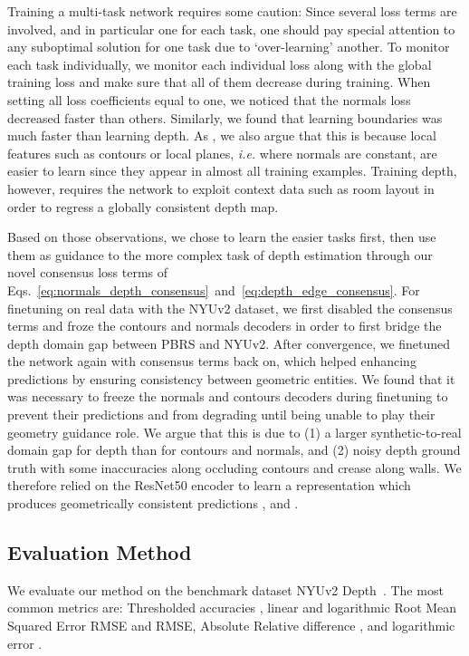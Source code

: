 \documentclass[10pt,twocolumn,letterpaper]{article}
\begin{document}
Training a multi-task network requires some caution: Since several loss terms
are involved, and in particular one for each task, one should pay special
attention to any suboptimal solution for one task due to `over-learning' 
another. To monitor each task individually, we monitor each individual loss 
along with the global training loss and make sure that all of them decrease 
during training. When setting all loss coefficients equal to one, we noticed 
that the normals loss  decreased faster than others. 
Similarly, we found that learning boundaries was much faster than learning 
depth. As \cite{zhang2018deepdepth}, we also argue that this is because local 
features such as contours or local planes, \emph{i.e.} where normals are 
constant, are easier to learn since they appear in almost all training 
examples. Training depth, however, requires the network to exploit context data 
such as room layout in order to regress a globally consistent depth map.

Based on those observations, we chose to learn the easier tasks first, then
use them as guidance to the more complex task of depth estimation through our
novel consensus loss terms of 
Eqs.~\eqref{eq:normals_depth_consensus}~and~\eqref{eq:depth_edge_consensus}. 
For finetuning on real data with the NYUv2 dataset, we first disabled the 
consensus terms and froze the contours and normals decoders in order to first 
bridge the depth domain gap between PBRS and NYUv2. After convergence, we 
finetuned the network again with consensus terms back on, which helped 
enhancing predictions by ensuring consistency between geometric entities. 
We found that it was necessary to freeze the normals and contours decoders 
during finetuning to prevent their predictions  and  from degrading 
until being unable to play their geometry guidance role.
We argue that this is due to (1) a larger synthetic-to-real domain gap for depth than for contours and normals, and (2) noisy depth ground truth with some inaccuracies along occluding contours and crease along walls.
We therefore relied on the ResNet50 encoder to learn a representation which 
produces geometrically consistent predictions ,  and .

\subsection{Evaluation Method}\label{ssec:evaluation}

We evaluate our method on the benchmark dataset NYUv2 Depth~\cite{Nyuv2}. The most common metrics are: Thresholded accuracies , linear and logarithmic Root Mean Squared Error RMSE and 
RMSE, Absolute Relative difference , and logarithmic error 
.
\end{document}
